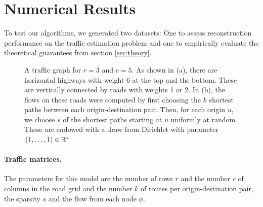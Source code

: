 \documentclass{article} %
\begin{document}
\section{Numerical Results}
To test our algorithms, we generated two datasets: One to assess reconstruction performance on the traffic estimation problem and one to empirically evaluate the theoretical guarantees from section \ref{sec:theory}.
\begin{figure}
  \qquad
  \caption{A traffic graph for $r=3$ and $c=5$. As shown in (a), there are horizontal highways with weight $6$ at the top and the bottom. These are vertically connected by roads with weights 1 or 2. In (b), the flows on these roads were computed by first choosing the $k$ shortest paths between each origin-destination pair. Then, for each origin $u$, we choose $s$ of the shortest paths starting at $u$ uniformly at random. These are endowed with a draw from Dirichlet with parameter $(1, \dots, 1)\in \mathbb{R}^s$}
\end{figure}
\paragraph{Traffic matrices.} The parameters for this model are the number of rows $r$ and the number $c$ of columns in the road grid and the number $k$ of routes per origin-destination pair, the sparsity $s$ and the flow from each node $\phi$.
\end{document}
